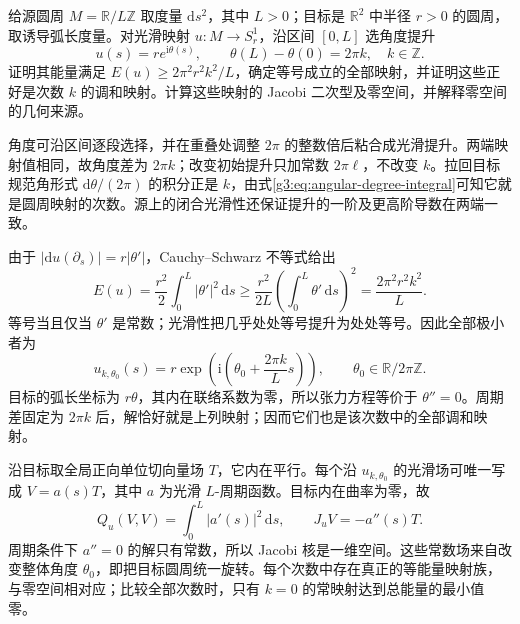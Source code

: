 \begin{exercise}\label{g3:ex:circle-map-degree-energy-minimizers}
	给源圆周 \(M=\mathbb R/L\mathbb Z\) 取度量 \(\mathrm ds^2\)，其中 \(L>0\)；目标是 \(\mathbb R^2\) 中半径 \(r>0\) 的圆周，取诱导弧长度量。对光滑映射 \(u:M\to S^1_r\)，沿区间 \([0,L]\) 选角度提升
	\[
		u(s)=r e^{\mathrm i\theta(s)},\qquad
		\theta(L)-\theta(0)=2\pi k,\quad k\in\mathbb Z.
	\]
	证明其能量满足 \(E(u)\ge2\pi^2r^2k^2/L\)，确定等号成立的全部映射，并证明这些正好是次数 \(k\) 的调和映射。计算这些映射的 Jacobi 二次型及零空间，并解释零空间的几何来源。
\end{exercise}
\begin{solution}
	角度可沿区间逐段选择，并在重叠处调整 \(2\pi\) 的整数倍后粘合成光滑提升。两端映射值相同，故角度差为 \(2\pi k\)；改变初始提升只加常数 \(2\pi\ell\)，不改变 \(k\)。拉回目标规范角形式 \(\mathrm d\theta/(2\pi)\) 的积分正是 \(k\)，由式\eqref{g3:eq:angular-degree-integral}可知它就是圆周映射的次数。源上的闭合光滑性还保证提升的一阶及更高阶导数在两端一致。

	由于 \(|\mathrm du(\partial_s)|=r|\theta'|\)，Cauchy--Schwarz 不等式给出
	\[
		E(u)=\frac{r^2}{2}\int_0^L|\theta'|^2\,\mathrm ds
		\ge\frac{r^2}{2L}\left(\int_0^L\theta'\,\mathrm ds\right)^2
		=\frac{2\pi^2r^2k^2}{L}.
	\]
	等号当且仅当 \(\theta'\) 是常数；光滑性把几乎处处等号提升为处处等号。因此全部极小者为
	\[
		u_{k,\theta_0}(s)=r\exp\left(\mathrm i\left(\theta_0+\frac{2\pi k}{L}s\right)\right),
		\qquad \theta_0\in\mathbb R/2\pi\mathbb Z.
	\]
	目标的弧长坐标为 \(r\theta\)，其内在联络系数为零，所以张力方程等价于 \(\theta''=0\)。周期差固定为 \(2\pi k\) 后，解恰好就是上列映射；因而它们也是该次数中的全部调和映射。

	沿目标取全局正向单位切向量场 \(T\)，它内在平行。每个沿 \(u_{k,\theta_0}\) 的光滑场可唯一写成 \(V=a(s)T\)，其中 \(a\) 为光滑 \(L\)-周期函数。目标内在曲率为零，故
	\[
		Q_u(V,V)=\int_0^L|a'(s)|^2\,\mathrm ds,
		\qquad J_uV=-a''(s)T.
	\]
	周期条件下 \(a''=0\) 的解只有常数，所以 Jacobi 核是一维空间。这些常数场来自改变整体角度 \(\theta_0\)，即把目标圆周统一旋转。每个次数中存在真正的等能量映射族，与零空间相对应；比较全部次数时，只有 \(k=0\) 的常映射达到总能量的最小值零。
\end{solution}

